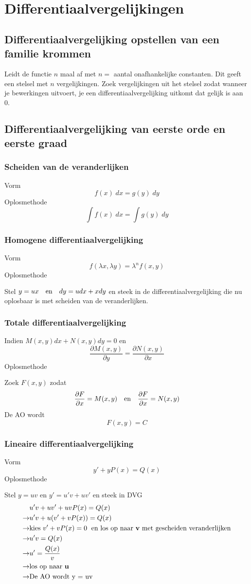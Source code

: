 \documentclass{report}
\begin{document}
\chapter*{Differentiaalvergelijkingen}
\section*{Differentiaalvergelijking opstellen van een familie krommen}
Leidt de functie $n$ maal af met $n = $ aantal onafhankelijke constanten. Dit geeft een stelsel met $n$ vergelijkingen. Zoek vergelijkingen uit het stelsel zodat wanneer je bewerkingen uitvoert, je een differentiaalvergelijking uitkomt dat gelijk is aan 0.
\section*{Differentiaalvergelijking van eerste orde en eerste graad}
\subsection*{Scheiden van de veranderlijken}
Vorm
$$f(x)\;dx = g(y)\;dy$$
Oplosmethode
$$\int f(x)\;dx = \int g(y)\;dy$$
\subsection*{Homogene differentiaalvergelijking}
Vorm
$$f(\lambda x,\lambda y) = \lambda^n f(x, y)$$
Oplosmethode

Stel $y = ux \quad \hbox{en} \quad dy = udx + xdy$ en steek in de differentiaalvergelijking die nu oplosbaar is met scheiden van de veranderlijken.
\subsection*{Totale differentiaalvergelijking}
Indien $M(x, y)dx + N(x, y)dy = 0$ en $$\frac{\partial M(x,y)}{\partial y} = \frac{\partial N(x,y)}{\partial x}$$
Oplosmethode

Zoek $F(x, y)$ zodat
$$\frac{\partial F}{\partial x} = M(x,y) \quad \hbox{en} \quad \frac{\partial F}{\partial x} = N(x, y)$$
De AO wordt $$F(x, y) = C$$
\subsection*{Lineaire differentiaalvergelijking}
Vorm
$$y' + yP(x) = Q(x)$$
Oplosmethode

Stel $y = uv$ en $y' = u'v + uv'$ en steek in DVG 
\begin{equation*}
 \begin{split}
                & u'v + uv' + uvP(x) = Q(x) \\
  \rightarrow   & u'v + u(v' + vP(x)) = Q(x) \\
  \rightarrow   & \hbox{kies } v' + vP(x) = 0 \; \hbox{ en los op naar \textbf{v} met gescheiden veranderlijken} \\
  \rightarrow   & u'v = Q(x) \\
  \rightarrow   & u' = \frac{Q(x)}{v} \\
  \rightarrow   & \hbox{los op naar \textbf{u}} \\
  \rightarrow   & \hbox{De AO wordt y = uv}
 \end{split}
\end{equation*}
\end{document}
